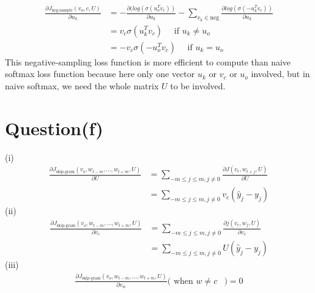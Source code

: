 \documentclass[11pt]{article}
\begin{document}
\begin{equation}
\begin{aligned}
\frac{\partial J_{\text{neg-sample}}(v_o, c, U)}{\partial u_k} &= -\frac{\partial(log(\sigma(u_o^Tv_c))}{\partial u_k} - \sum_{v_k \in \text{neg}}\frac{\partial log(\sigma(-u_k^Tv_c))}{\partial u_k}\\
&= v_c\sigma(u_k^Tv_c) \quad\text{ if } u_k \ne u_o\\
&= -v_c\sigma(-u_o^Tv_c) \quad\text{ if } u_k = u_o
\end{aligned}
\end{equation} 
This negative-sampling loss function is more efficient to compute than naive softmax loss function because here only one vector $u_k$ or $v_c$ or $u_o$ involved, but in naive softmax, we need the whole matrix $U$ to be involved.
\section{Question(f)}
(i) \begin{equation}
\begin{aligned}
\frac{\partial J_{\text{skip-gram}}(v_o, w_{t-m}, ... , w_{t+m}, U)}{\partial U} &=
\sum_{-m \le j \le m, j \ne 0}\frac{\partial J(v_c, w_{t+j}, U)}{\partial U} \\
&= \sum_{-m \le j \le m, j \ne 0}v_{c}(\hat y_j - y_j) 
\end{aligned}
\end{equation} 
(ii) \begin{equation}
\begin{aligned}
\frac{\partial J_{\text{skip-gram}}(v_o, w_{t-m}, ... , w_{t+m}, U)}{\partial v_c} &= \sum_{-m \le j \le m, j \ne 0} \frac{\partial j(v_c, w_j, U)}{\partial v_c} \\ &= \sum_{-m \le j \le m, j \ne 0}U(\hat y_j - y_j)
\end{aligned}
\end{equation} 
(iii) \begin{equation}
\begin{aligned}
\frac{\partial J_{\text{skip-gram}}(v_o, w_{t-m}, ... , w_{t+m}, U)}{\partial v_w} (\text{ when } w \ne c &)= 0
\end{aligned}
\end{equation} 
\end{document}
